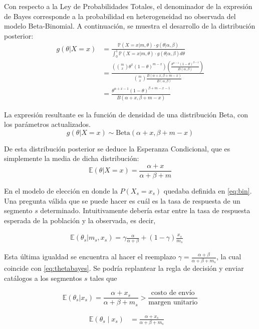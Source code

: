 \documentclass[
]{book}
\begin{document}
Con respecto a la Ley de Probabilidades Totales, el denominador de la
expresión de Bayes corresponde a la probabilidad en heterogeneidad no
observada del modelo Beta-Binomial. A continuación, se muestra el
desarrollo de la distribución posterior: \[
\begin{aligned}
g(\theta|X=x) &= \frac{\mathbb{P}(X=x|m, \theta) \cdot g(\theta|\alpha, \beta)}{\int_0^1 \mathbb{P}(X=x|m, \theta) \cdot g(\theta|\alpha, \beta) d\theta} \\
&= \frac{ \left( \binom{m}{x} \theta^x (1-\theta)^{m-x} \right) \left( \frac{\theta^{\alpha-1}(1-\theta)^{\beta-1}}{B(\alpha, \beta)} \right) }{ \binom{m}{x} \frac{B(\alpha+x, \beta+m-x)}{B(\alpha, \beta)} } \\
&= \frac{\theta^{\alpha+x-1}(1-\theta)^{\beta+m-x-1}}{B(\alpha+x, \beta+m-x)}
\end{aligned}
\]

La expresión resultante es la función de densidad de una distribución
Beta, con los parámetros actualizados.
\[g(\theta|X=x) \sim \text{Beta}(\alpha+x, \beta+m-x)\]

De esta distribución posterior se deduce la Esperanza Condicional, que
es simplemente la media de dicha distribución:
\[ \mathbb{E}(\theta|X=x) = \frac{\alpha+x}{\alpha+\beta+m} \]

En el modelo de elección en donde la \(P(X_s = x_s)\) quedaba definida en
\eqref{eq:bin}. Una pregunta válida que se puede hacer es cuál es la tasa
de respuesta de un segmento \(s\) determinado. Intuitivamente debería
estar entre la tasa de respuesta esperada de la población y la
observada, es decir,

\[ 
\begin{aligned}
\mathbb{E}(\theta_s|m_s,x_s)=\gamma \frac{\alpha}{\alpha+\beta} + (1-\gamma) \frac{x_s}{m_s}
\end{aligned}
\quad \label{eq:tasa} 
\]

Esta última igualdad se encuentra al hacer el reemplazo
\(\gamma = \frac{\alpha + \beta}{\alpha + \beta + m_s}\), la cual coincide
con \eqref{eq:thetabayes}. Se podría replantear la regla de decisión y
enviar catálogos a los segmentos \(s\) tales que

\[\mathbb{E} (\theta_s|x_s) =\frac{\alpha + x_s}{\alpha + \beta + m_s} > \frac{\text{costo de envío}}{\text{margen unitario}}\]

\[ 
\begin{aligned}
\mathbb{E}(\theta_s \mid x_s) &= \frac{\alpha + x_s}{\alpha + \beta + m_s}
\end{aligned}
\quad \label{eq:esp} \]
\end{document}
